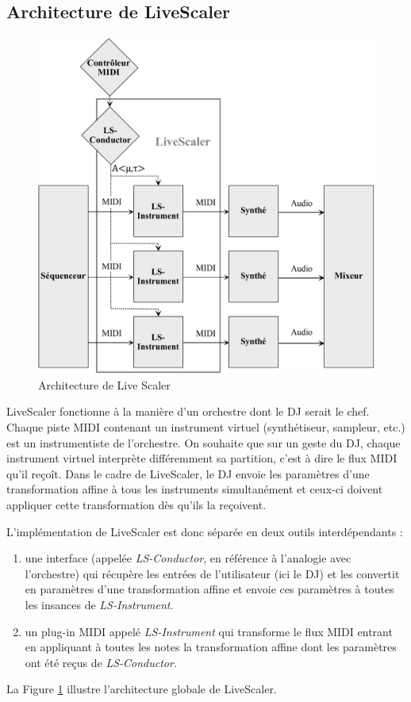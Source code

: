 \subsection{Architecture de LiveScaler}

\begin{figure}[htbp]
  \centering
  \includegraphics[width=\textwidth]{Figures/architecture-LS.pdf}
  \caption{Architecture de Live Scaler\label{Fig:archi}}
\end{figure}

LiveScaler fonctionne à la manière d'un orchestre dont le DJ serait le chef. Chaque piste MIDI contenant un instrument virtuel (synthétiseur, sampleur, etc.) est un instrumentiste de l'orchestre. On souhaite que sur un geste du DJ, chaque instrument virtuel interprète différemment sa partition, c'est à dire le flux MIDI qu'il reçoît. Dans le cadre de LiveScaler, le DJ envoie les paramètres d'une transformation affine à tous les instruments simultanément et ceux-ci doivent appliquer cette transformation dès qu'ils la reçoivent.

L'implémentation de LiveScaler est donc séparée en deux outils interdépendants : 
\begin{enumerate}
  \item une interface (appelée \emph{LS-Conductor}, en référence à l'analogie avec l'orchestre) qui récupère les entrées de l'utilisateur (ici le DJ) et les convertit en paramètres d'une transformation affine et envoie ces paramètres à toutes les insances de \emph{LS-Instrument}.
  \item un plug-in MIDI appelé \emph{LS-Instrument} qui transforme le flux MIDI entrant en appliquant à toutes les notes la transformation affine dont les paramètres ont été reçus de \emph{LS-Conductor}.
\end{enumerate}
La Figure \ref{Fig:archi} illustre l'architecture globale de LiveScaler.

